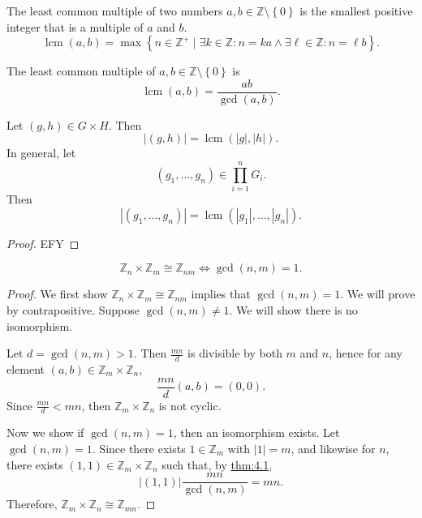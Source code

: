 \begin{definition}\label{dfn:sjk}
	The least common multiple of two numbers $a,b\in\mathbb{Z}\setminus\left\{ 0 \right\} $ is the smallest positive integer that is a multiple of $a$ and $b$.
	\[
		\operatorname{lcm}(a,b) = \max \left\{ n\in\mathbb{Z}^+ \mid \exists k\in\mathbb{Z}: n=ka\land \exists \ell \in\mathbb{Z}: n=\ell b \right\} 
	.\]
\end{definition}
\begin{proposition}
	The least common multiple of $a,b\in\mathbb{Z}\setminus\left\{ 0 \right\} $ is
	\[
		\operatorname{lcm}(a,b) = \frac{ab}{\operatorname{gcd}(a,b) }
	.\]
\end{proposition}
\begin{theorem}\label{thm:kjsd}
	Let $(g,h)\in G\times H$. Then
	\[
		\left| (g,h) \right| =\operatorname{lcm}(\left| g \right| ,\left| h \right| ) 
	.\]
	In general, let
	\[
		\left( g_1, \dots, g_n  \right) \in \prod_{i=1}^{n} G_i 
	.\]
	Then
	\[
		\left| \left( g_1, \dots, g_n  \right)  \right| =\operatorname{lcm}(\left| g_1 \right| , \dots, \left| g_n \right| ) 
	.\]
	
\end{theorem}
\begin{proof}
	EFY
\end{proof}
\begin{theorem}\label{thm:kjsdfndsb}
	\[
		\mathbb{Z}_n\times \mathbb{Z}_m \cong \mathbb{Z}_{nm}\iff \operatorname{gcd}(n,m) =1
	.\]
\end{theorem}
\begin{proof}
	We first show $\mathbb{Z}_{n}\times \mathbb{Z}_m \cong \mathbb{Z}_{nm}$ implies that $\operatorname{gcd}(n,m) =1$. We will prove by contrapositive. Suppose $\operatorname{gcd}(n,m) \neq 1$. We will show there is no isomorphism.

	Let $d=\operatorname{gcd}(n,m) >1$. Then $\frac{mn}{d}$ is divisible by both $m$ and $n$, hence for any element $(a,b)\in \mathbb{Z}_m \times \mathbb{Z}_n$,
	\[
		\frac{mn}{d}(a,b)=(0,0)
	.\]
	Since $\frac{mn}{d}<mn$, then $\mathbb{Z}_m\times \mathbb{Z}_n$ is not cyclic.

	Now we show if $\operatorname{gcd}(n,m) =1$, then an isomorphism exists. Let $\operatorname{gcd}(n,m) =1$. Since there exists $1\in\mathbb{Z}_m$ with $\left| 1 \right| =m$, and likewise for $n$, there exists $(1,1)\in\mathbb{Z}_m\times \mathbb{Z}_n$ such that, by \hyperref[theorem 4.1]{thm:4.1},
	\[
		\left| (1,1) \right| \frac{mn}{\operatorname{gcd}(n,m) }=mn
	.\]
	Therefore, $\mathbb{Z}_m \times \mathbb{Z}_n \cong \mathbb{Z}_{mn}$.
\end{proof}

